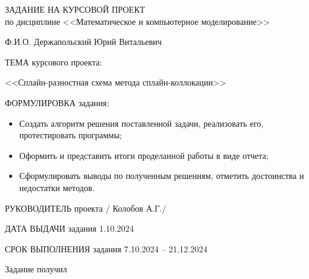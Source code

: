 \begin{center}
    ЗАДАНИЕ НА КУРСОВОЙ ПРОЕКТ\\
    по дисциплине <<Математическое и компьютерное моделирование>>
\end{center}
    
Ф.И.О. Держапольский Юрий Витальевич

\vspace*{10pt}

ТЕМА курсового проекта:

<<Сплайн-разностная схема метода сплайн-коллокации>>

\vspace*{10pt}

ФОРМУЛИРОВКА задания:
\begin{itemize}
    \item Создать алгоритм решения поставленной задачи, реализовать его, протестировать программы;
    \item Оформить и представить итоги проделанной работы в виде отчета;
    \item Сформулировать выводы по полученным решениям, отметить достоинства и недостатки методов.
\end{itemize}

РУКОВОДИТЕЛЬ проекта \underline{\hspace{100pt}} / Колобов А.Г./

ДАТА ВЫДАЧИ задания 1.10.2024

СРОК ВЫПОЛНЕНИЯ задания 7.10.2024 – 21.12.2024

Задание получил \underline{\hspace{200pt}}